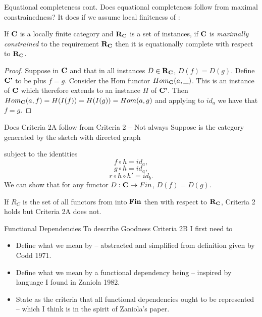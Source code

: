\begin{frame}{Equational completeness cont. }
Does equational completeness follow from maximal constrainedness?
It does if we assume local finiteness of \catc:
\begin{lemma}
If $\textbf{C}$ is a locally finite category and $\textbf{R}_{\textbf{C}}$ is a set of instances, if $\textbf{C}$ 
 is
\textit{maximally constrained} to the requirement $\textbf{R}_{\textbf{C}}$ then it is equationally
complete with respect to $\textbf{R}_{\textbf{C}}$.
\end{lemma}
\begin{proof}
Suppose \fgparalleldiagram  in $\textbf{C}$ and that in all instances $D \in \textbf{R}_{\textbf{C}}$, $D(f)=D(g)$. 
Define $\textbf{C'}$ to be \catc plus $f=g$. Consider the Hom functor $Hom_{\textbf{C}}(a,\_)$. 
This is an instance of $\textbf{C}$ which therefore extends to an instance $H$ of $\textbf{C'}$.  Then
$Hom_{\textbf{C}}(a,f)=H(I(f))=H(I(g))=Hom(a,g)$ and applying to $id_a$ we have that $f=g$.
\end{proof}
\end{frame}

\begin{frame}{Does Criteria 2A follow from Criteria 2 -- Not always}
Suppose \catcw is the category generated by the sketch with directed graph

subject to the identities
\begin{equation}
\label{fhidentity}
f \circ h = id_a,
\end{equation}
\begin{equation}
\label{ghidentity}
g \circ h = id_a,
\end{equation}
\begin{equation}
\label{rhhpidentity}
r \circ h \circ h' = id_b.
\end{equation}
We can show that for any functor $D:\textbf{C} \rightarrow Fin$, $D(f)=D(g)$. 

If $R_C$ is the set of all functors from \catcw into $\textbf{Fin}$ then with respect to $\textbf{R}_{\textbf{C}}$, Criteria 2 holds but Criteria 2A does not.
\end{frame}

\begin{frame}{Functional Dependencies}
To describe Goodness Criteria 2B I first need to
\begin{itemize}
\item Define what we mean by 
-- abstracted and simplified from definition given by Codd 1971.
\item Define what we mean by a functional dependency being 
-- inspired by language I found in Zaniola 1982.
\item State as the criteria that all functional dependencies ought to be represented -- which I think is in
the spirit of Zaniola's paper. 
\end{itemize}
\end{frame}

